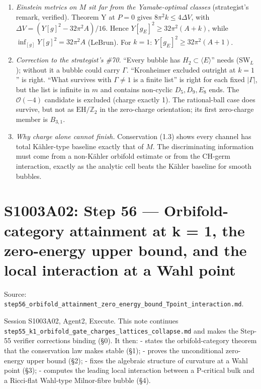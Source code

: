 \documentclass[
  10pt,
]{report}
\providecommand{\tightlist}{%
  \setlength{\itemsep}{0pt}\setlength{\parskip}{0pt}}
\begin{document}
\begin{enumerate}
\def\labelenumi{\arabic{enumi}.}
\tightlist
\item
  \emph{Einstein metrics on \(M\) sit far from the Yamabe-optimal
  classes} (strategist's remark, verified). Theorem Y at \(P=0\) gives
  \(8\pi^2k\le4\Delta V\), with \(\Delta V=(Y[g]^2-32\pi^2A)/16\). Hence
  \(Y[g_E]^2\ge32\pi^2(A+k)\), while \(\inf_{[g]}Y[g]^2=32\pi^2A\)
  (LeBrun). For \(k=1\): \(Y[g_E]^2\ge32\pi^2(A+1)\).
\item
  \emph{Correction to the strategist's \#70.} ``Every bubble has
  \(H_2\subset\langle E\rangle\)'' needs (SW\(_L\)); without it a bubble
  could carry \(\Gamma\). ``Kronheimer excluded outright at \(k=1\)'' is
  right. ``What survives with \(\Gamma\ne1\) is a finite list'' is right
  for each fixed \(|\Gamma|\), but the list is infinite in \(m\) and
  contains non-cyclic \(D_5,D_9,E_8\) ends. The \(\mathcal O(-4)\)
  candidate is excluded (charge exactly 1). The rational-ball case does
  survive, but not as \(\mathrm{EH}/\mathbb Z_2\) in the zero-charge
  orientation; its first zero-charge member is \(B_{3,1}\).
\item
  \emph{Why charge alone cannot finish.} Conservation (1.3) shows every
  channel has total Kähler-type baseline exactly that of \(M\). The
  discriminating information must come from a non-Kähler orbifold
  estimate or from the CH-germ interaction, exactly as the analytic cell
  beats the Kähler baseline for smooth bubbles.
\end{enumerate}

\hypertarget{s1003a02-step-56-orbifold-category-attainment-at-k-1-the-zero-energy-upper-bound-and-the-local-interaction-at-a-wahl-point}{%
\chapter{S1003A02: Step 56 --- Orbifold-category attainment at k = 1,
the zero-energy upper bound, and the local interaction at a Wahl
point}\label{s1003a02-step-56-orbifold-category-attainment-at-k-1-the-zero-energy-upper-bound-and-the-local-interaction-at-a-wahl-point}}

Source:
\texttt{step56\_orbifold\_attainment\_zero\_energy\_bound\_Tpoint\_interaction.md}.

Session S1003A02, Agent2, Execute. This note continues
\texttt{step55\_k1\_orbifold\_gate\_charges\_lattices\_collapse.md} and
makes the Step-55 verifier corrections binding (§0). It then: - states
the orbifold-category theorem that the conservation law makes stable
(§1); - proves the unconditional zero-energy upper bound (§2); - fixes
the algebraic structure of curvature at a Wahl point (§3); - computes
the leading local interaction between a P-critical bulk and a Ricci-flat
Wahl-type Milnor-fibre bubble (§4).
\end{document}
